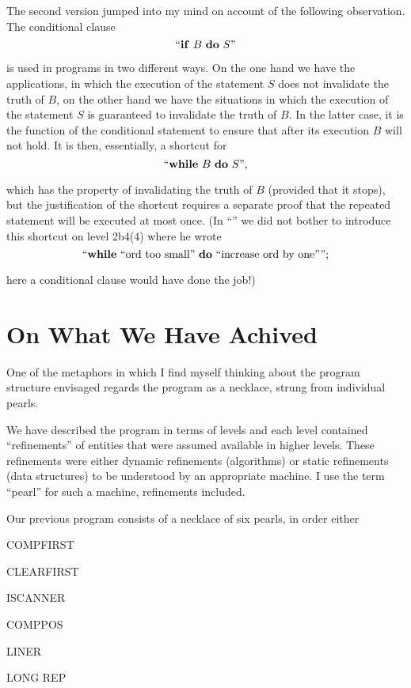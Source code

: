 The second version jumped into my mind on account of the following observation. The conditional clause
$$
\text{``\textbf{if} } B \text{ \textbf{do} } S\text{''}
$$

\noindent
is used in programs in two different ways. On the one hand we have the applications, in which the execution of the statement $S$ does not invalidate the truth of $B$, on the other hand we have the situations in which the execution of the statement $S$ is guaranteed to invalidate the truth of $B$. In the latter case, it is the function of the conditional statement to ensure that after its execution $B$ will not hold. It is then, essentially, a shortcut for
$$
\text{``\textbf{while} } B \text{ \textbf{do} } S\text{'',}
$$

\noindent
which has the property of invalidating the truth of $B$ (provided that it stops), but the justification of the shortcut requires a separate proof that the repeated statement will be executed at most once. (In ``'' we did not bother to introduce this shortcut on level 2b4(4) where he wrote
$$
\text{``\textbf{while} ``ord too small'' \textbf{do} ``increase ord by one'''';}
$$

\noindent
here a conditional clause would have done the job!)

\section[On what we have achived]{On What We Have Achived}

One of the metaphors in which I find myself thinking about the program structure envisaged regards the program as a necklace, strung from individual pearls.

We have described the program in terms of levels and each level contained ``refinements'' of entities that were assumed available in higher levels. These refinements were either dynamic refinements (algorithms) or static refinements (data structures) to be understood by an appropriate machine. I use the term ``pearl'' for such a machine, refinements included.

Our previous program consists of a necklace of six pearls, in order either

COMPFIRST

CLEARFIRST

ISCANNER

COMPPOS

LINER

LONG REP

